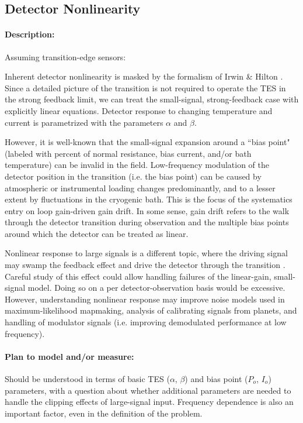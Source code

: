 \subsection{Detector Nonlinearity}
\label{det_nonlinearity}

\paragraph{Description:}
Assuming transition-edge sensors:

Inherent detector nonlinearity is masked by the formalism of Irwin \& Hilton \cite{IrwinHilton:2008}. Since a detailed picture of the transition is not required to operate the TES in the strong feedback limit, we can treat the small-signal, strong-feedback case with explicitly linear equations. Detector response to changing temperature and current is parametrized with the parameters $\alpha$ and $\beta$.

However, it is well-known that the small-signal expansion around a ``bias point" (labeled with percent of normal resistance, bias current, and/or bath temperature) can be invalid in the field. Low-frequency modulation of the detector position in the transition (i.e. the bias point) can be caused by atmospheric or instrumental loading changes predominantly, and to a lesser extent by fluctuations in the cryogenic bath. This is the focus of the systematics entry on loop gain-driven gain drift. In some sense, gain drift refers to the walk through the detector transition during observation and the multiple bias points around which the detector can be treated as linear.

Nonlinear response to large signals is a different topic, where the driving signal may swamp the feedback effect and drive the detector through the transition \cite{Rostem}. Careful study of this effect could allow handling failures of the linear-gain, small-signal model. Doing so on a per detector-observation basis would be excessive. However, understanding nonlinear response may improve noise models used in maximum-likelihood mapmaking, analysis of calibrating signals from planets, and handling of modulator signals (i.e. improving demodulated performance at low frequency).

\paragraph{Plan to model and/or measure:}

Should be understood in terms of basic TES ($\alpha$, $\beta$) and bias point ($P_o$, $I_o$) parameters, with a question about whether additional parameters are needed to handle the clipping effects of large-signal input. Frequency dependence is also an important factor, even in the definition of the problem.

